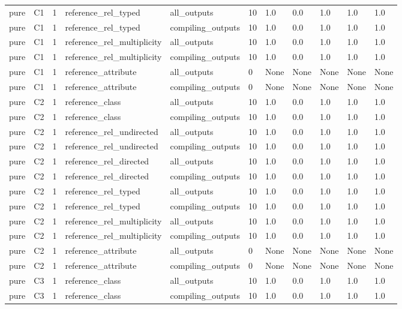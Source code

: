 \begin{tabular}{lllllllllll}
pure & C1 & 1 & reference\_rel\_typed & all\_outputs & 10 & 1.0 & 0.0 & 1.0 & 1.0 & 1.0 \\
pure & C1 & 1 & reference\_rel\_typed & compiling\_outputs & 10 & 1.0 & 0.0 & 1.0 & 1.0 & 1.0 \\
pure & C1 & 1 & reference\_rel\_multiplicity & all\_outputs & 10 & 1.0 & 0.0 & 1.0 & 1.0 & 1.0 \\
pure & C1 & 1 & reference\_rel\_multiplicity & compiling\_outputs & 10 & 1.0 & 0.0 & 1.0 & 1.0 & 1.0 \\
pure & C1 & 1 & reference\_attribute & all\_outputs & 0 & None & None & None & None & None \\
pure & C1 & 1 & reference\_attribute & compiling\_outputs & 0 & None & None & None & None & None \\
pure & C2 & 1 & reference\_class & all\_outputs & 10 & 1.0 & 0.0 & 1.0 & 1.0 & 1.0 \\
pure & C2 & 1 & reference\_class & compiling\_outputs & 10 & 1.0 & 0.0 & 1.0 & 1.0 & 1.0 \\
pure & C2 & 1 & reference\_rel\_undirected & all\_outputs & 10 & 1.0 & 0.0 & 1.0 & 1.0 & 1.0 \\
pure & C2 & 1 & reference\_rel\_undirected & compiling\_outputs & 10 & 1.0 & 0.0 & 1.0 & 1.0 & 1.0 \\
pure & C2 & 1 & reference\_rel\_directed & all\_outputs & 10 & 1.0 & 0.0 & 1.0 & 1.0 & 1.0 \\
pure & C2 & 1 & reference\_rel\_directed & compiling\_outputs & 10 & 1.0 & 0.0 & 1.0 & 1.0 & 1.0 \\
pure & C2 & 1 & reference\_rel\_typed & all\_outputs & 10 & 1.0 & 0.0 & 1.0 & 1.0 & 1.0 \\
pure & C2 & 1 & reference\_rel\_typed & compiling\_outputs & 10 & 1.0 & 0.0 & 1.0 & 1.0 & 1.0 \\
pure & C2 & 1 & reference\_rel\_multiplicity & all\_outputs & 10 & 1.0 & 0.0 & 1.0 & 1.0 & 1.0 \\
pure & C2 & 1 & reference\_rel\_multiplicity & compiling\_outputs & 10 & 1.0 & 0.0 & 1.0 & 1.0 & 1.0 \\
pure & C2 & 1 & reference\_attribute & all\_outputs & 0 & None & None & None & None & None \\
pure & C2 & 1 & reference\_attribute & compiling\_outputs & 0 & None & None & None & None & None \\
pure & C3 & 1 & reference\_class & all\_outputs & 10 & 1.0 & 0.0 & 1.0 & 1.0 & 1.0 \\
pure & C3 & 1 & reference\_class & compiling\_outputs & 10 & 1.0 & 0.0 & 1.0 & 1.0 & 1.0 \\

\end{tabular}
